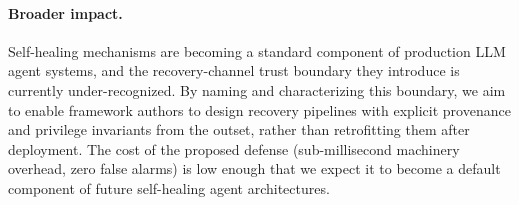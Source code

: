\paragraph{Broader impact.} Self-healing mechanisms are becoming a standard component of production LLM agent systems, and the recovery-channel trust boundary they introduce is currently under-recognized. By naming and characterizing this boundary, we aim to enable framework authors to design recovery pipelines with explicit provenance and privilege invariants from the outset, rather than retrofitting them after deployment. The cost of the proposed defense (sub-millisecond machinery overhead, zero false alarms) is low enough that we expect it to become a default component of future self-healing agent architectures.
